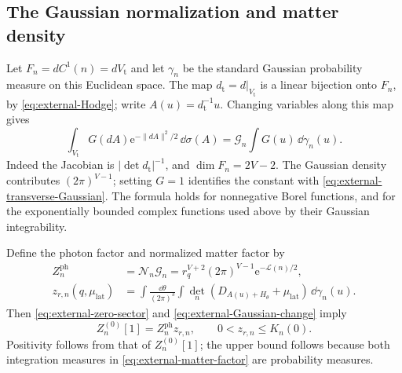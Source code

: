 \subsection{The Gaussian normalization and matter density}
\label{subsec:external-Gaussian-law}

Let $F_n=dC^1(n)=dV_{\mathrm t}$ and let $\gamma_n$
be the standard Gaussian probability measure on this
Euclidean space. The map $d_{\mathrm t}=d|_{V_{\mathrm t}}$
is a linear bijection onto $F_n$, by
\eqref{eq:external-Hodge}; write $A(u)=d_{\mathrm t}^{-1}u$.
Changing variables along this map gives
\begin{equation}\label{eq:external-Gaussian-change}
 \int_{V_{\mathrm t}}G(dA)\mathrm e^{-\|dA\|^2/2}\,\dd\sigma(A)
                     =\mathcal G_n\int G(u)\,\dd\gamma_n(u).
\end{equation}
Indeed the Jacobian is $|\det d_{\mathrm t}|^{-1}$,
and $\dim F_n=2V-2$. The Gaussian density contributes
$(2\pi)^{V-1}$; setting $G=1$ identifies the constant
with \eqref{eq:external-transverse-Gaussian}.
The formula holds for nonnegative Borel functions,
and for the exponentially bounded complex functions
used above by their Gaussian integrability.

Define the photon factor and normalized matter factor by
\begin{align}
 Z_n^{\mathrm{ph}}&=\mathcal N_n\mathcal G_n
       =r_q^{V+2}(2\pi)^{V-1}
                            \mathrm e^{-\mathcal L(n)/2},
                                  \label{eq:external-photon-factor}\\
 z_{r,n}(q,\mu_{\mathrm{lat}})
   &=\int\frac{\dd\theta}{(2\pi)^3}
       \int\det_n(D_{A(u)+H_\theta}+\mu_{\mathrm{lat}})
                                             \,\dd\gamma_n(u).
                                  \label{eq:external-matter-factor}
\end{align}
Then \eqref{eq:external-zero-sector} and
\eqref{eq:external-Gaussian-change} imply
\begin{equation}\label{eq:external-zero-factorization}
 Z_n^{(0)}[1]=Z_n^{\mathrm{ph}}z_{r,n},\qquad
                         0<z_{r,n}\le K_n(0).
\end{equation}
Positivity follows from that of $Z_n^{(0)}[1]$;
the upper bound follows because both integration
measures in \eqref{eq:external-matter-factor} are
probability measures.

